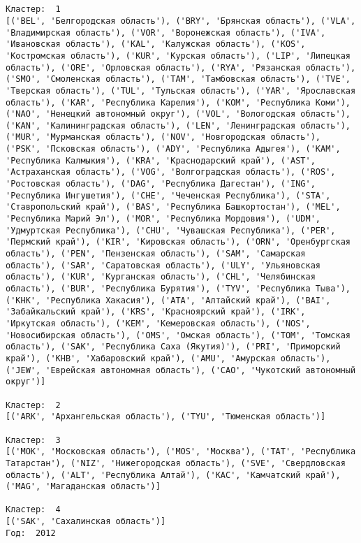 \documentclass[11pt]{article}
\begin{document}
    \begin{center}
    \end{center}
    { \hspace*{\fill} \\}
    
    \begin{Verbatim}[commandchars=\\\{\}]

Кластер:  1
[('BEL', 'Белгородская область'), ('BRY', 'Брянская область'), ('VLA', 'Владимирская область'), ('VOR', 'Воронежская область'), ('IVA', 'Ивановская область'), ('KAL', 'Калужская область'), ('KOS', 'Костромская область'), ('KUR', 'Курская область'), ('LIP', 'Липецкая область'), ('ORE', 'Орловская область'), ('RYA', 'Рязанская область'), ('SMO', 'Смоленская область'), ('TAM', 'Тамбовская область'), ('TVE', 'Тверская область'), ('TUL', 'Тульская область'), ('YAR', 'Ярославская область'), ('KAR', 'Республика Карелия'), ('KOM', 'Республика Коми'), ('NAO', 'Ненецкий автономный округ'), ('VOL', 'Вологодская область'), ('KAN', 'Калинингpадская область'), ('LEN', 'Ленинградская область'), ('MUR', 'Мурманская область'), ('NOV', 'Новгородская область'), ('PSK', 'Псковская область'), ('ADY', 'Республика Адыгея'), ('KAM', 'Республика Калмыкия'), ('KRA', 'Краснодарский край'), ('AST', 'Астраханская область'), ('VOG', 'Волгоградская область'), ('ROS', 'Ростовская область'), ('DAG', 'Республика Дагестан'), ('ING', 'Республика Ингушетия'), ('CHE', 'Чеченская Республика'), ('STA', 'Ставропольский край'), ('BAS', 'Республика Башкортостан'), ('MEL', 'Республика Марий Эл'), ('MOR', 'Республика Мордовия'), ('UDM', 'Удмуртская Республика'), ('CHU', 'Чувашская Республика'), ('PER', 'Пермский край'), ('KIR', 'Кировская область'), ('ORN', 'Оренбургская область'), ('PEN', 'Пензенская область'), ('SAM', 'Самарская область'), ('SAR', 'Саратовская область'), ('ULY', 'Ульяновская область'), ('KUR', 'Курганская область'), ('CHL', 'Челябинская область'), ('BUR', 'Республика Бурятия'), ('TYV', 'Республика Тыва'), ('KHK', 'Республика Хакасия'), ('ATA', 'Алтайский край'), ('BAI', 'Забайкальский край'), ('KRS', 'Красноярский край'), ('IRK', 'Иркутская область'), ('KEM', 'Кемеровская область'), ('NOS', 'Новосибирская область'), ('OMS', 'Омская область'), ('TOM', 'Томская область'), ('SAK', 'Республика Саха (Якутия)'), ('PRI', 'Приморский край'), ('KHB', 'Хабаровский край'), ('AMU', 'Амурская область'), ('JEW', 'Еврейская автономная область'), ('CAO', 'Чукотский автономный округ')]

Кластер:  2
[('ARK', 'Архангельская область'), ('TYU', 'Тюменская область')]

Кластер:  3
[('MOK', 'Московская область'), ('MOS', 'Москва'), ('TAT', 'Республика Татарстан'), ('NIZ', 'Нижегородская область'), ('SVE', 'Свердловская область'), ('ALT', 'Республика Алтай'), ('KAC', 'Камчатский край'), ('MAG', 'Магаданская область')]

Кластер:  4
[('SAK', 'Сахалинская область')]
Год:  2012

    \end{Verbatim}
\end{document}
